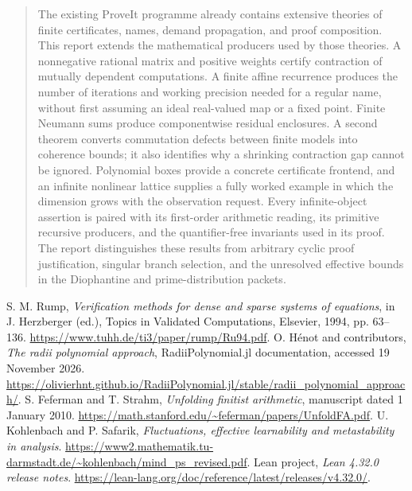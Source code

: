 \documentclass[11pt,a4paper]{article}
\theoremstyle{definition}
\theoremstyle{remark}
\begin{document}
\begin{abstract}
The existing ProveIt programme already contains extensive theories of
finite certificates, names, demand propagation, and proof composition.
This report extends the mathematical producers used by those theories.
A nonnegative rational matrix and positive weights certify contraction
of mutually dependent computations. A finite affine recurrence produces
the number of iterations and working precision needed for a regular
name, without first assuming an ideal real-valued map or a fixed point.
Finite Neumann sums produce componentwise residual enclosures. A second
theorem converts commutation defects between finite models into
coherence bounds; it also identifies why a shrinking contraction gap
cannot be ignored. Polynomial boxes provide a concrete certificate
frontend, and an infinite nonlinear lattice supplies a fully worked
example in which the dimension grows with the observation request.
Every infinite-object assertion is paired with its first-order
arithmetic reading, its primitive recursive producers, and the
quantifier-free invariants used in its proof. The report distinguishes
these results from arbitrary cyclic proof justification, singular
branch selection, and the unresolved effective bounds in the
Diophantine and prime-distribution packets.
\end{abstract}

\tableofcontents
\newpage









\clearpage



\clearpage
\begin{thebibliography}{99}
\raggedright

 S. M. Rump, \emph{Verification methods for dense and
sparse systems of equations}, in J. Herzberger (ed.), Topics in Validated
Computations, Elsevier, 1994, pp. 63--136.
\url{https://www.tuhh.de/ti3/paper/rump/Ru94.pdf}.
 O. H\'enot and contributors, \emph{The radii polynomial
approach}, RadiiPolynomial.jl documentation, accessed 19 November 2026.
\url{https://olivierhnt.github.io/RadiiPolynomial.jl/stable/radii_polynomial_approach/}.
 S. Feferman and T. Strahm,
\emph{Unfolding finitist arithmetic}, manuscript dated 1 January 2010.
\url{https://math.stanford.edu/~feferman/papers/UnfoldFA.pdf}.
 U. Kohlenbach and P. Safarik,
\emph{Fluctuations, effective learnability and metastability in analysis}.
\url{https://www2.mathematik.tu-darmstadt.de/~kohlenbach/mind_ps_revised.pdf}.
 Lean project, \emph{Lean 4.32.0 release notes}.
\url{https://lean-lang.org/doc/reference/latest/releases/v4.32.0/}.
\end{thebibliography}
\end{document}
